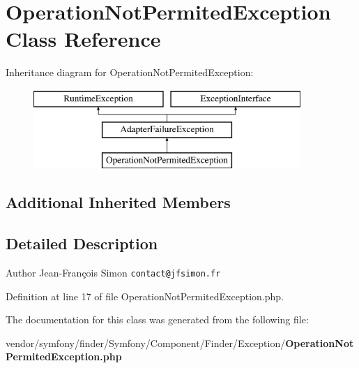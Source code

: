 \section{Operation\+Not\+Permited\+Exception Class Reference}
\label{class_symfony_1_1_component_1_1_finder_1_1_exception_1_1_operation_not_permited_exception}
Inheritance diagram for Operation\+Not\+Permited\+Exception\+:\begin{figure}[H]
\begin{center}
\leavevmode
\includegraphics[height=3.000000cm]{class_symfony_1_1_component_1_1_finder_1_1_exception_1_1_operation_not_permited_exception}
\end{center}
\end{figure}
\subsection*{Additional Inherited Members}


\subsection{Detailed Description}
\begin{DoxyAuthor}{Author}
Jean-\/\+François Simon {\tt contact@jfsimon.\+fr} 
\end{DoxyAuthor}


Definition at line 17 of file Operation\+Not\+Permited\+Exception.\+php.



The documentation for this class was generated from the following file\+:\begin{DoxyCompactItemize}
\item 
vendor/symfony/finder/\+Symfony/\+Component/\+Finder/\+Exception/{\bf Operation\+Not\+Permited\+Exception.\+php}\end{DoxyCompactItemize}
